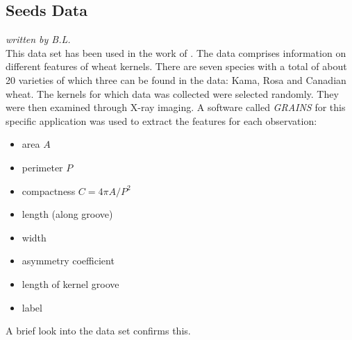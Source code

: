 \subsection{Seeds Data}
\textit{written by B.L.}\\

This data set has been used in the work of \cite{charytanowicz2010complete}. The data comprises information on different features of wheat kernels. There are seven species with a total of about 20 varieties of which three can be found in the data: Kama, Rosa and Canadian wheat. The kernels for which data was collected were selected randomly. They were then examined through X-ray imaging. A software called \textit{GRAINS} for this specific application \cite{strumillo1999computer} was used to extract the features for each observation:

\begin{multicols}{2}
\begin{itemize}
\item area $A$
\item perimeter $P$
\item compactness $C = 4 \pi A/P^{2}$
\item length (along groove)
\item width
\item asymmetry coefficient
\item length of kernel groove
\item label
\end{itemize}
\end{multicols}

A brief look into the data set confirms this.

\begin{table}[H]
\begin{center}
\end{center}
\caption{Seeds Data Set First Observations}
\label{tab:seeds_key_facts}
\end{table}

